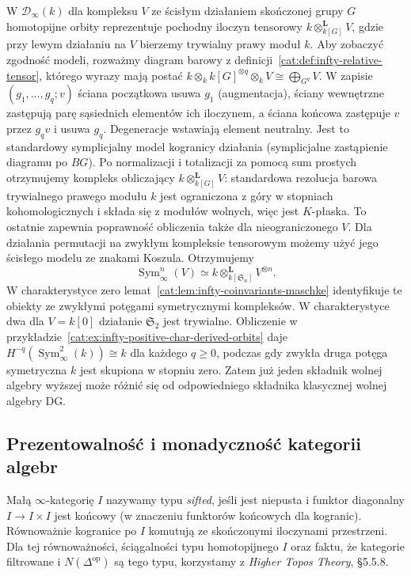 \begin{przyklad}\label{cat:ex:infty-free-sym-derived}
W $\mathcal D_\infty(k)$ dla kompleksu $V$ ze ścisłym działaniem skończonej grupy $G$ homotopijne orbity reprezentuje pochodny iloczyn tensorowy $k\otimes_{k[G]}^{\mathbf L}V$, gdzie przy lewym działaniu na $V$ bierzemy trywialny prawy moduł $k$. Aby zobaczyć zgodność modeli, rozważmy diagram barowy z definicji~\ref{cat:def:infty-relative-tensor}, którego wyrazy mają postać $k\otimes_k k[G]^{\otimes q}\otimes_k V\cong\bigoplus_{G^q} V$. W zapisie $(g_1,\ldots,g_q;v)$ ściana początkowa usuwa $g_1$ (augmentacja), ściany wewnętrzne zastępują parę sąsiednich elementów ich iloczynem, a ściana końcowa zastępuje $v$ przez $g_qv$ i usuwa $g_q$. Degeneracje wstawiają element neutralny. Jest to standardowy symplicjalny model kogranicy działania (symplicjalne zastąpienie diagramu po $BG$). Po normalizacji i totalizacji za pomocą sum prostych otrzymujemy kompleks obliczający $k\otimes_{k[G]}^{\mathbf L}V$: standardowa rezolucja barowa trywialnego prawego modułu $k$ jest ograniczona z góry w stopniach kohomologicznych i składa się z modułów wolnych, więc jest $K$-płaska. To ostatnie zapewnia poprawność obliczenia także dla nieograniczonego $V$. Dla działania permutacji na zwykłym kompleksie tensorowym możemy użyć jego ścisłego modelu ze znakami Koszula. Otrzymujemy
\[
 \operatorname{Sym}^n_\infty(V)\simeq
 k\otimes_{k[\mathfrak S_n]}^{\mathbf L}V^{\otimes n}.
\]
W charakterystyce zero lemat~\ref{cat:lem:infty-coinvariants-maschke} identyfikuje te obiekty ze zwykłymi potęgami symetrycznymi kompleksów. W charakterystyce dwa dla $V=k[0]$ działanie $\mathfrak S_2$ jest trywialne. Obliczenie w przykładzie~\ref{cat:ex:infty-positive-char-derived-orbits} daje $H^{-q}(\operatorname{Sym}^2_\infty(k))\cong k$ dla każdego $q\geq0$, podczas gdy zwykła druga potęga symetryczna $k$ jest skupiona w stopniu zero. Zatem już jeden składnik wolnej algebry wyższej może różnić się od odpowiedniego składnika klasycznej wolnej algebry DG.
\end{przyklad}

\subsection{Prezentowalność i monadyczność kategorii algebr}

\begin{definicja}\label{cat:def:infty-sifted}
Małą $\infty$-kategorię $I$ nazywamy typu \emph{sifted}, jeśli jest niepusta i funktor diagonalny $I\to I\times I$ jest końcowy (w znaczeniu funktorów końcowych dla kogranic). Równoważnie kogranice po $I$ komutują ze skończonymi iloczynami przestrzeni. Dla tej równoważności, ściągalności typu homotopijnego $I$ oraz faktu, że kategorie filtrowane i $N(\Delta^{\mathrm{op}})$ są tego typu, korzystamy z \emph{Higher Topos Theory}, \S5.5.8.
\end{definicja}

